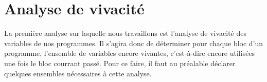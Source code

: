 \section{Analyse de vivacité}
La première analyse sur laquelle nous travaillons est l'analyse de vivacité des variables de nos programmes. 
Il s'agira donc de déterminer pour chaque bloc d'un programme, l'ensemble de variables encore vivantes, c'est-à-dire
encore utilisées une fois le bloc courrant passé. Pour ce faire, il faut au préalable déclarer quelques ensembles 
nécessaires à cette analyse.




